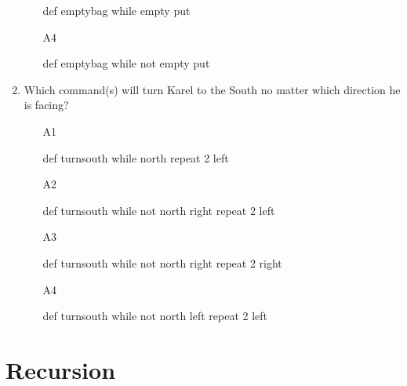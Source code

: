 \begin{enumerate}
\begin{enumerate}
\begin{bluecode}
def emptybag
    while empty
        put
\end{bluecode}
\item[A4] 
\begin{bluecode}
def emptybag
    while not empty
        put
\end{bluecode}
\end{enumerate}
\item Which command(s) will turn Karel to the South no matter 
      which direction he is facing?
\begin{enumerate}
\item[A1] 
\begin{bluecode}
def turnsouth
    while north
        repeat 2
            left
\end{bluecode}
\item[A2] 
\begin{bluecode}
def turnsouth
    while not north
        right
    repeat 2
        left
\end{bluecode}
\item[A3] 
\begin{bluecode}
def turnsouth
    while not north
        right
    repeat 2
        right
\end{bluecode}
\item[A4] 
\begin{bluecode}
def turnsouth
    while not north
        left
    repeat 2
        left
\end{bluecode}
\end{enumerate}
\end{enumerate}



\section{Recursion}


